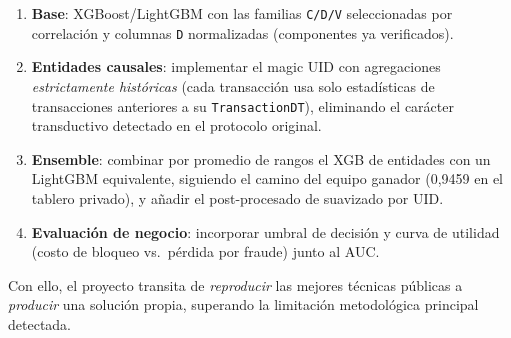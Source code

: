 \begin{enumerate}
  \item \textbf{Base}: XGBoost/LightGBM con las familias \texttt{C/D/V} seleccionadas por
        correlación y columnas \texttt{D} normalizadas (componentes ya verificados).
  \item \textbf{Entidades causales}: implementar el magic UID con agregaciones
        \emph{estrictamente históricas} (cada transacción usa solo estadísticas de
        transacciones anteriores a su \texttt{TransactionDT}), eliminando el carácter
        transductivo detectado en el protocolo original.
  \item \textbf{Ensemble}: combinar por promedio de rangos el XGB de entidades con un LightGBM
        equivalente, siguiendo el camino del equipo ganador (0{,}9459 en el tablero
        privado), y añadir el post-procesado de suavizado por UID.
  \item \textbf{Evaluación de negocio}: incorporar umbral de decisión y curva de utilidad
        (costo de bloqueo vs.\ pérdida por fraude) junto al AUC.
\end{enumerate}

Con ello, el proyecto transita de \emph{reproducir} las mejores técnicas públicas a
\emph{producir} una solución propia, superando la limitación metodológica principal detectada.
